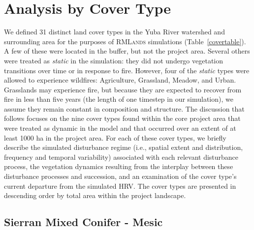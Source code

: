 
\chapter{Analysis by Cover Type}
\label{ch:covtype}
We defined 31 distinct land cover types in the Yuba River watershed and surrounding area for the purposes of \textsc{RMLands} simulations (Table~\ref{covertable}). A few of these were located in the buffer, but not the project area. Several others were treated as \emph{static} in the simulation: they did not undergo vegetation transitions over time or in response to fire. However, four of the \emph{static} types were allowed to experience wildfires: Agriculture, Grassland, Meadow, and Urban. Grasslands may experience fire, but because they are expected to recover from fire in less than five years (the length of one timestep in our simulation), we assume they remain constant in composition and structure. The discussion that follows focuses on the nine cover types found within the core project area that were treated as dynamic in the model and that occurred over an extent of at least 1000 ha in the project area. For each of these cover types, we briefly describe the simulated disturbance regime (i.e., spatial extent and distribution, frequency and temporal variability) associated with each relevant disturbance process, the vegetation dynamics resulting from the interplay between these disturbance processes and succession, and an examination of the cover type’s current departure from the simulated HRV. The cover types are presented in descending order by total area within the project landscape.








\clearpage
\section{Sierran Mixed Conifer - Mesic} 


